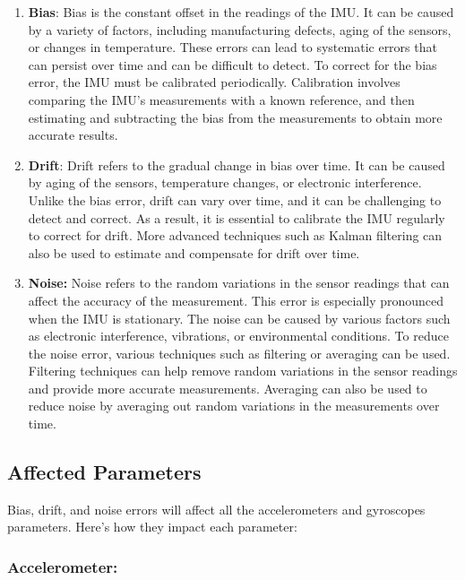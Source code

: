 \begin{enumerate}
	\item\textbf{Bias}: Bias is the constant offset in the readings of the IMU. It can be caused by a variety of factors, including manufacturing defects, aging of the sensors, or changes in temperature. These errors can lead to systematic errors that can persist over time and can be difficult to detect. To correct for the bias error, the IMU must be calibrated periodically. Calibration involves comparing the IMU's measurements with a known reference, and then estimating and subtracting the bias from the measurements to obtain more accurate results.\cite{sabatini:2011}
	
	\item \textbf{Drift}: Drift refers to the gradual change in bias over time. It can be caused by aging of the sensors, temperature changes, or electronic interference. Unlike the bias error, drift can vary over time, and it can be challenging to detect and correct. As a result, it is essential to calibrate the IMU regularly to correct for drift. More advanced techniques such as Kalman filtering can also be used to estimate and compensate for drift over time.\cite{Tedaldi:2014}
	
	\item \textbf{Noise:} Noise refers to the random variations in the sensor readings that can affect the accuracy of the measurement. This error is especially pronounced when the IMU is stationary. The noise can be caused by various factors such as electronic interference, vibrations, or environmental conditions. To reduce the noise error, various techniques such as filtering or averaging can be used. Filtering techniques can help remove random variations in the sensor readings and provide more accurate measurements. Averaging can also be used to reduce noise by averaging out random variations in the measurements over time.\cite{Faragher:2014}
\end{enumerate}

\subsection{Affected Parameters}
Bias, drift, and noise errors will affect all the accelerometers and gyroscopes parameters. Here's how they impact each parameter:

\subsubsection{Accelerometer:}

